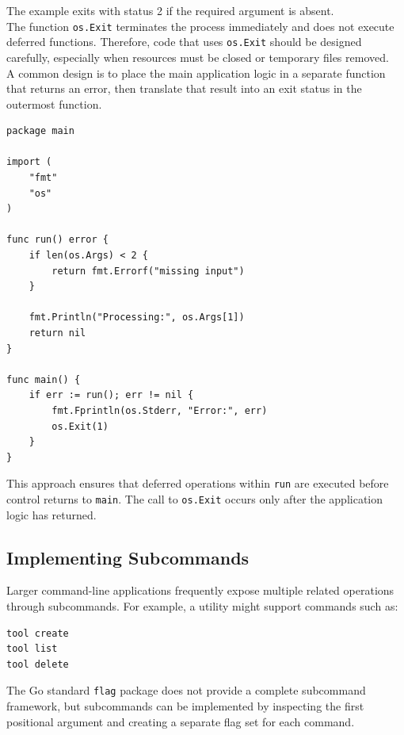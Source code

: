 The example exits with status 2 if the required argument is absent.\\

The function \texttt{os.Exit} terminates the process immediately and does not execute deferred functions. Therefore, code that uses \texttt{os.Exit} should be designed carefully, especially when resources must be closed or temporary files removed.\\

A common design is to place the main application logic in a separate function that returns an error, then translate that result into an exit status in the outermost function.\\

\begin{lstlisting}
package main

import (
    "fmt"
    "os"
)

func run() error {
    if len(os.Args) < 2 {
        return fmt.Errorf("missing input")
    }

    fmt.Println("Processing:", os.Args[1])
    return nil
}

func main() {
    if err := run(); err != nil {
        fmt.Fprintln(os.Stderr, "Error:", err)
        os.Exit(1)
    }
}
\end{lstlisting}

This approach ensures that deferred operations within \texttt{run} are executed before control returns to \texttt{main}. The call to \texttt{os.Exit} occurs only after the application logic has returned.\\

\subsection{Implementing Subcommands}

Larger command-line applications frequently expose multiple related operations through subcommands. For example, a utility might support commands such as:

\begin{lstlisting}
tool create
tool list
tool delete
\end{lstlisting}

The Go standard \texttt{flag} package does not provide a complete subcommand framework, but subcommands can be implemented by inspecting the first positional argument and creating a separate flag set for each command.\\

